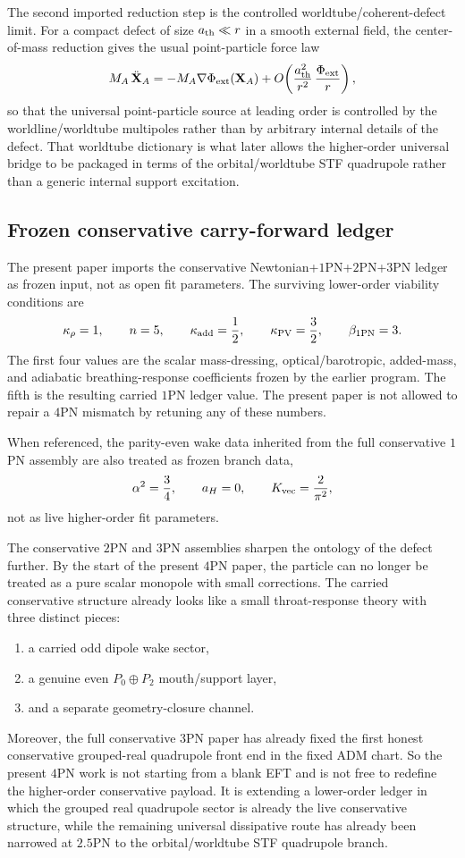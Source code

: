 \documentclass[11pt]{article}
\begin{document}
The second imported reduction step is the controlled worldtube/coherent-defect
limit.  For a compact defect of size $a_{\rm th}\ll r$ in a smooth external field,
the center-of-mass reduction gives the usual point-particle force law
\[
M_A\,\ddot{\mathbf X}_A
=
-M_A\nabla\Phi_{\rm ext}(\mathbf X_A)
+O\!\left(\frac{a_{\rm th}^2}{r^2}\,\frac{\Phi_{\rm ext}}{r}\right),
\]
so that the universal point-particle source at leading order is controlled by
the worldline/worldtube multipoles rather than by arbitrary internal details of
the defect.  That worldtube dictionary is what later allows the higher-order
universal bridge to be packaged in terms of the orbital/worldtube STF
quadrupole rather than a generic internal support excitation.

\subsection{Frozen conservative carry-forward ledger}
\label{sec:dictionary-carry-forward}

The present paper imports the conservative Newtonian+$1$PN+$2$PN+$3$PN ledger as
frozen input, not as open fit parameters.  The surviving lower-order viability
conditions are
\[
\kappa_\rho = 1,
\qquad
n = 5,
\qquad
\kappa_{\rm add}=\frac12,
\qquad
\kappa_{\rm PV}=\frac32,
\qquad
\beta_{\rm 1PN}=3.
\]
The first four values are the scalar mass-dressing, optical/barotropic,
added-mass, and adiabatic breathing-response coefficients frozen by the earlier
program.  The fifth is the resulting carried $1$PN ledger value.  The present
paper is not allowed to repair a $4$PN mismatch by retuning any of these
numbers.

When referenced, the parity-even wake data inherited from the full conservative
$1$PN assembly are also treated as frozen branch data,
\[
\alpha^2=\frac34,
\qquad
a_H=0,
\qquad
K_{\rm vec}=\frac{2}{\pi^2},
\]
not as live higher-order fit parameters.

The conservative $2$PN and $3$PN assemblies sharpen the ontology of the defect
further.  By the start of the present $4$PN paper, the particle can no longer be
treated as a pure scalar monopole with small corrections.  The carried
conservative structure already looks like a small throat-response theory with
three distinct pieces:
\begin{enumerate}
  \item a carried odd dipole wake sector,
  \item a genuine even $P_0\oplus P_2$ mouth/support layer,
  \item and a separate geometry-closure channel.
\end{enumerate}
Moreover, the full conservative $3$PN paper has already fixed the first honest
conservative grouped-real quadrupole front end in the fixed ADM chart.  So the
present $4$PN work is not starting from a blank EFT and is not free to redefine
the higher-order conservative payload.  It is extending a lower-order ledger in
which the grouped real quadrupole sector is already the live conservative
structure, while the remaining universal dissipative route has already been
narrowed at $2.5$PN to the orbital/worldtube STF quadrupole branch.
\end{document}
